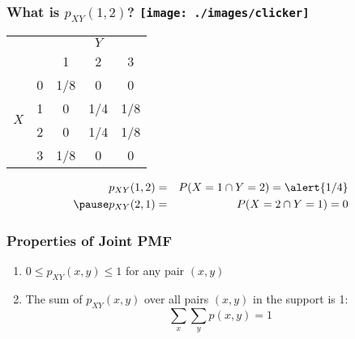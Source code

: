 \begin{frame}
\frametitle{What is $p_{XY}(1,2)$? \hfill \texttt{[image: ./images/clicker]}}

\begin{table}
\begin{tabular}{|cc|ccc|}
\hline
&&\multicolumn{3}{c|}{$Y$}\\
&&1 & 2&3\\
\hline
\multirow{4}{*}{$X$}
&0& \multicolumn{1}{|c}{\alert{1/8}} & \alert{0}& \alert{0}\\
&1& \multicolumn{1}{|c}{\alert{0}} & \alert{1/4}&\alert{1/8}\\
&2& \multicolumn{1}{|c}{\alert{0}} & \alert{1/4}&\alert{1/8}\\
&3& \multicolumn{1}{|c}{\alert{1/8}} & \alert{0}&\alert{0}\\
\hline
\end{tabular}
\end{table}

\pause

\begin{eqnarray*}
p_{XY}(1,2) &=& P(X=1 \cap Y =2) = \alert{1/4}\\ \pause
p_{XY}(2,1) &=& P(X=2 \cap Y =1) = 0
\end{eqnarray*}


\end{frame}


\begin{frame}
\frametitle{Properties of Joint PMF}
	\begin{enumerate}
		\item $0\leq p_{XY}(x,y)\leq 1$ for any pair $(x,y)$
		\item The sum of $p_{XY}(x,y)$ over all pairs $(x,y)$ in the support is 1:
			$$\sum_{x}\sum_{y} p(x,y) = 1$$
	\end{enumerate}
\end{frame}


